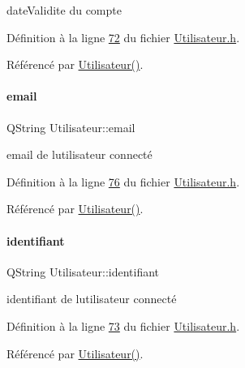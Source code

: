 date\+Validite du compte 



Définition à la ligne \hyperlink{_utilisateur_8h_source_l00072}{72} du fichier \hyperlink{_utilisateur_8h_source}{Utilisateur.\+h}.



Référencé par \hyperlink{_utilisateur_8cpp_source_l00022}{Utilisateur()}.

\mbox{\label{class_utilisateur_a2f45443ce5277a5e6baefe5121e66555}} 
\paragraph{\texorpdfstring{email}{email}}
{\footnotesize\ttfamily Q\+String Utilisateur\+::email\hspace{0.3cm}{\ttfamily [private]}}



email de l\textquotesingle{}utilisateur connecté 



Définition à la ligne \hyperlink{_utilisateur_8h_source_l00076}{76} du fichier \hyperlink{_utilisateur_8h_source}{Utilisateur.\+h}.



Référencé par \hyperlink{_utilisateur_8cpp_source_l00022}{Utilisateur()}.

\mbox{\label{class_utilisateur_a1e79e47202a2c716346f47adbbeb2511}} 
\paragraph{\texorpdfstring{identifiant}{identifiant}}
{\footnotesize\ttfamily Q\+String Utilisateur\+::identifiant\hspace{0.3cm}{\ttfamily [private]}}



identifiant de l\textquotesingle{}utilisateur connecté 



Définition à la ligne \hyperlink{_utilisateur_8h_source_l00073}{73} du fichier \hyperlink{_utilisateur_8h_source}{Utilisateur.\+h}.



Référencé par \hyperlink{_utilisateur_8cpp_source_l00022}{Utilisateur()}.

